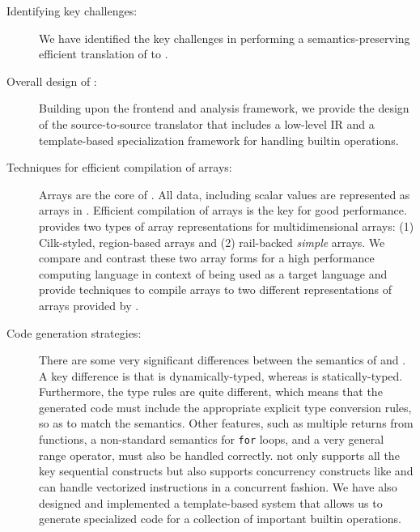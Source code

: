 \begin{description}

\item[Identifying key challenges:] We have identified the key challenges
in performing a semantics-preserving efficient translation of \matlab to \xten.

\item[Overall design of \mixten:] Building upon the \mclab frontend and analysis
framework, we provide the design of the \mixten
source-to-source translator that includes a low-level \xten IR and a
template-based specialization framework for handling builtin operations.

\item[Techniques for efficient compilation of \matlab arrays:] Arrays are
the core of \matlab. All data, including scalar values are represented
as arrays in \matlab. Efficient compilation of arrays is the key for
good performance. \xten provides two
types of array representations for multidimensional arrays: (1)
Cilk-styled, region-based arrays and (2) rail-backed \emph{simple} arrays. 
We compare
and contrast these two array forms for a high performance computing
language in context of being used as a target language and provide techniques
to compile \matlab arrays to two different representations of arrays provided
by \xten.

\item[Code generation strategies:]  There
are some very significant differences between the semantics of \matlab
and \xten.  A key difference is that \matlab is dynamically-typed,
whereas \xten is statically-typed.   Furthermore, the type rules are
quite different, which means that the generated \xten code must include
the appropriate explicit type conversion rules, so as to match the
\matlab semantics.   Other \matlab features, such as multiple returns
from functions, a non-standard semantics for \texttt{for} loops, and a
very general range operator, must also be handled correctly.
\mixten not only supports all the key sequential constructs but also supports
concurrency constructs like \parfor and can handle vectorized instructions in a
concurrent fashion.
We have also designed and implemented a template-based system that allows us to
generate specialized \xten code for a collection of important \matlab builtin
operations.


\end{description}
